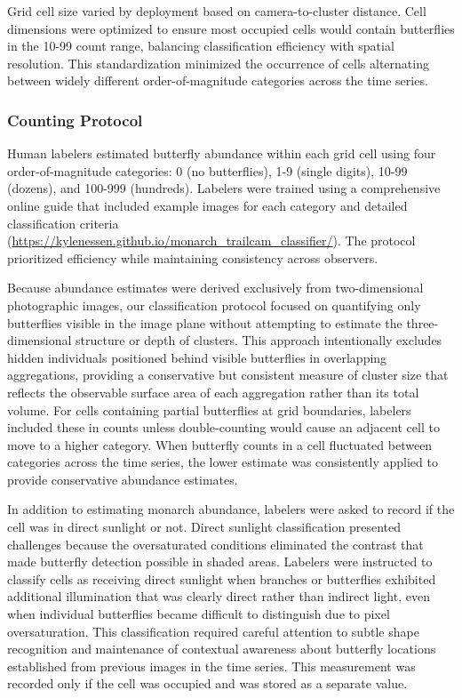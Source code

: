 Grid cell size varied by deployment based on camera-to-cluster distance. Cell dimensions were optimized to ensure most occupied cells would contain butterflies in the 10-99 count range, balancing classification efficiency with spatial resolution. This standardization minimized the occurrence of cells alternating between widely different order-of-magnitude categories across the time series.

\subsubsection{Counting Protocol}

Human labelers estimated butterfly abundance within each grid cell using four order-of-magnitude categories: 0 (no butterflies), 1-9 (single digits), 10-99 (dozens), and 100-999 (hundreds). Labelers were trained using a comprehensive online guide that included example images for each category and detailed classification criteria (\url{https://kylenessen.github.io/monarch_trailcam_classifier/}). The protocol prioritized efficiency while maintaining consistency across observers.

Because abundance estimates were derived exclusively from two-dimensional photographic images, our classification protocol focused on quantifying only butterflies visible in the image plane without attempting to estimate the three-dimensional structure or depth of clusters. This approach intentionally excludes hidden individuals positioned behind visible butterflies in overlapping aggregations, providing a conservative but consistent measure of cluster size that reflects the observable surface area of each aggregation rather than its total volume. For cells containing partial butterflies at grid boundaries, labelers included these in counts unless double-counting would cause an adjacent cell to move to a higher category. When butterfly counts in a cell fluctuated between categories across the time series, the lower estimate was consistently applied to provide conservative abundance estimates.

In addition to estimating monarch abundance, labelers were asked to record if the cell was in direct sunlight or not. Direct sunlight classification presented challenges because the oversaturated conditions eliminated the contrast that made butterfly detection possible in shaded areas. Labelers were instructed to classify cells as receiving direct sunlight when branches or butterflies exhibited additional illumination that was clearly direct rather than indirect light, even when individual butterflies became difficult to distinguish due to pixel oversaturation. This classification required careful attention to subtle shape recognition and maintenance of contextual awareness about butterfly locations established from previous images in the time series. This measurement was recorded only if the cell was occupied and was stored as a separate value.

